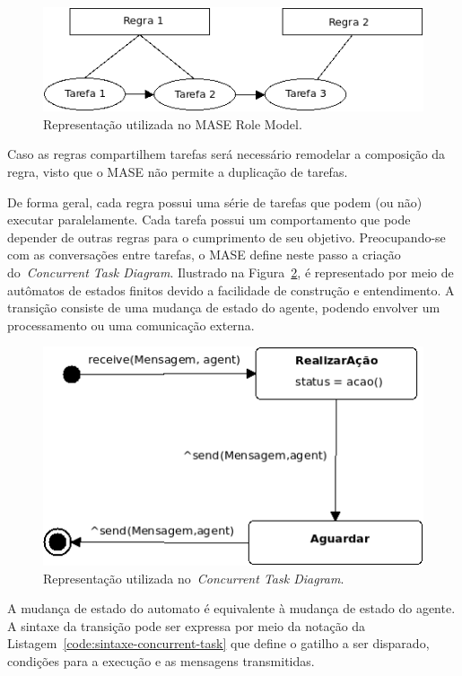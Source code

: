 \begin{figure}
	\centering
	\includegraphics[scale=0.65]{images/exemplo-mase-role-model.png}
	\caption{Representação utilizada no MASE Role Model.}
	\label{fig:exemplo-mase-role-model}
\end{figure}

Caso as regras compartilhem tarefas será necessário remodelar a composição da regra, visto que o MASE não permite a duplicação de tarefas. 

De forma geral, cada regra possui uma série de tarefas que podem (ou não) executar paralelamente. Cada tarefa possui um comportamento que pode depender de outras regras para o cumprimento de seu objetivo. Preocupando-se com as conversações entre tarefas, o MASE define neste passo a criação do~\emph{Concurrent Task Diagram}. Ilustrado na Figura~\ref{fig:examplo-diagrama-tarefas-concorrentes}, é representado por meio de autômatos de estados finitos devido a facilidade de construção e entendimento. A transição consiste de uma mudança de estado do agente, podendo envolver um processamento ou uma comunicação externa.

\begin{figure}
	\centering
	\includegraphics[scale=0.65]{images/examplo-diagrama-tarefas-concorrentes.png}
	\caption{Representação utilizada no~\emph{Concurrent Task Diagram}.}
	\label{fig:examplo-diagrama-tarefas-concorrentes}
\end{figure}

A mudança de estado do automato é equivalente à mudança de estado do agente. A sintaxe da transição pode ser expressa por meio da notação da Listagem~\ref{code:sintaxe-concurrent-task} que define o gatilho a ser disparado, condições para a execução e as mensagens transmitidas.


